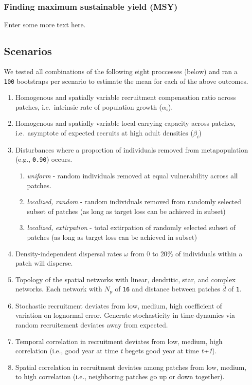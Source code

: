 \documentclass[]{article}
\providecommand{\tightlist}{%
  \setlength{\itemsep}{0pt}\setlength{\parskip}{0pt}}
\begin{document}
\subsubsection{Finding maximum sustainable yield
(MSY)}\label{finding-maximum-sustainable-yield-msy}

Enter some more text here.

\subsection{Scenarios}\label{scenarios}

We tested all combinations of the following eight proccesses (below) and
ran a \texttt{100} bootstraps per scenario to estimate the mean for each
of the above outcomes.

\begin{enumerate}
\def\labelenumi{\arabic{enumi}.}
\item
  Homogenous and spatially variable recruitment compensation ratio
  across patches, i.e.~intrinsic rate of population growth
  (\(\alpha_i\)).
\item
  Homogenous and spatially variable local carrying capacity across
  patches, i.e.~asymptote of expected recruits at high adult densities
  (\(\beta_i\))
\item
  Disturbances where a proportion of individuals removed from
  metapopulation (e.g., \texttt{0.90}) occurs.

  \begin{enumerate}
  \def\labelenumii{\alph{enumii}.}
  \tightlist
  \item
    \emph{uniform} - random individuals removed at equal vulnerability
    across all patches.
  \item
    \emph{localized, random} - random individuals removed from randomly
    selected subset of patches (as long as target loss can be achieved
    in subset)
  \item
    \emph{localized, extirpation} - total extirpation of randomly
    selected subset of patches (as long as target loss can be achieved
    in subset)
  \end{enumerate}
\item
  Density-independent dispersal rates \(\omega\) from 0 to 20\% of
  individuals within a patch will disperse.
\item
  Topology of the spatial networks with linear, dendritic, star, and
  complex networks. Each network with \(N_p\) of \texttt{16} and
  distance between patches \(\bar{d}\) of \texttt{1}.
\item
  Stochastic recruitment deviates from low, medium, high coefficient of
  variation on lognormal error. Generate stochasticity in time-dynamics
  via random recruitement deviates away from expected.
\item
  Temporal correlation in recruitment deviates from low, medium, high
  correlation (i.e., good year at time \emph{t} begets good year at time
  \emph{t+1}).
\item
  Spatial correlation in recruitment deviates among patches from low,
  medium, to high correlation (i.e., neighboring patches go up or down
  together).
\end{enumerate}
\end{document}
